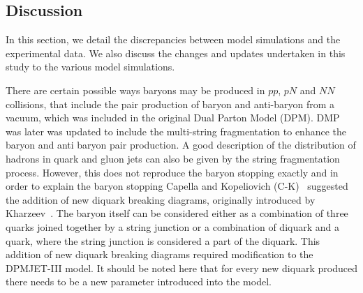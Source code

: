 \documentclass{article}
\begin{document}

\subsection{Discussion}

In this section, we detail the discrepancies between model simulations and the experimental data. We also discuss the changes and updates undertaken in this study to the various model simulations.

There are certain possible ways baryons may be produced in $pp$, $pN$ and $NN$ collisions, that include the pair production of baryon and anti-baryon from a vacuum, which was included in the original Dual Parton Model (DPM). DMP was later was updated to include the multi-string fragmentation to enhance the baryon and anti baryon pair production. A good description of the distribution of hadrons in quark and gluon jets can also be given by the string fragmentation process. However, this does not reproduce the baryon stopping exactly and in order to explain the baryon stopping Capella and Kopeliovich (C-K)~\cite{11, 12, 13} suggested the addition of new diquark breaking diagrams, originally introduced by Kharzeev~\cite{14}. The baryon itself can be considered either as a combination of three quarks joined together by a string junction or a combination of diquark and a quark, where the string junction is considered a part of the diquark. This addition of new diquark breaking diagrams required modification to the DPMJET-III model. It should be noted here that for every new diquark produced there needs to be a new parameter introduced into the model. 
\end{document}

